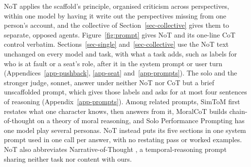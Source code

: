 NoT applies the scaffold's principle, organised criticism across
perspectives, within one model by having it write out the perspectives
missing from one person's account, and the collective of
Section~\ref{sec-collective} gives them to separate, opposed agents.
Figure~\ref{fig:prompt} gives NoT and its one-line CoT control verbatim.
Sections~\ref{sec-single} and~\ref{sec-collective} use the NoT text
unchanged on every model and task, with what a task adds, such as labels for
who is at fault or a seat's role, after it in the system prompt or user turn
(Appendices~\ref{app-pushback}, \ref{app-seat} and~\ref{app-prompts}).
The solo and the stronger judge, sonnet, answer under neither NoT nor CoT
but a brief unscaffolded prompt, which gives those labels and asks for at
most four sentences of reasoning (Appendix~\ref{app-prompts}).
Among related prompts, SimToM \citep{wilf2024simtom} first restates what
one character knows, then answers from it, MoralCoT \citep{jin22_moralcot}
builds chain-of-thought on a theory of moral reasoning, and Solo
Performance Prompting \citep{wang2024spp} has one model play several personas.
NoT instead puts its five sections in one system prompt used in one call per
answer, with no restating pass or worked examples.
NoT also abbreviates Narrative-of-Thought
\citep{zhang2024narrativeofthought}, a temporal-reasoning prompt sharing
neither task nor content with ours.

